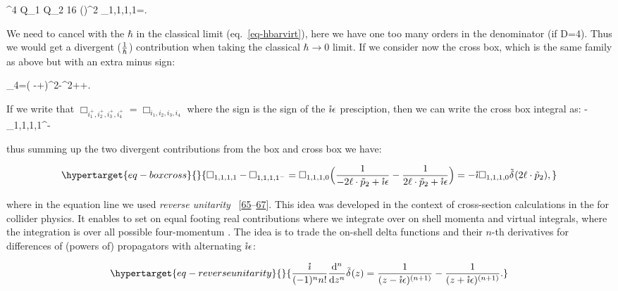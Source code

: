 \documentclass[
  11pt,
  a4paper,
  DIV=11,
  numbers=noendperiod,
  twoside]{scrreprt}
\let\[\relax \let\]\relax %
\DeclareRobustCommand{\[}{\begin{equation}}
\DeclareRobustCommand{\]}{\end{equation}}
\begin{document}
\[
\elch^4 Q_{1} Q_{2} 16 (\semom[1]\cdot \semom[2])^2 \int \dn[D]{{\ell}}\Box_{1,1,1,1}=\order[D-6]{\hbar}.
\]

We need to cancel with the \(\hbar\) in the classical limit
(eq.~\ref{eq-hbarvirt}), here we have one too many orders in the
denominator (if D=4). Thus we would get a divergent (\(\frac{1}{\hbar}\))
contribution when taking the classical \(\hbar\to 0\) limit. If we
consider now the cross box, which is the same family as above but with
an extra minus sign:

\[
\tilde{\rho}_4=( \Half[q] -\ell+\semom[2])^2-\mass[2]^2+\im \epsilon{}\ell\cdot\semom[2]+\im \epsilon.
\]

If we write that
\(\Box_{i_1^+,i_2^+,i_3^+,i_4^+}=\Box_{i_1,i_2,i_3,i_4}\) where the sign
is the sign of the \(\mathring{\imath}\epsilon\) presciption, then we can write the
cross box integral as: \[
\int \dn[D]{\ell} -\Box_{1,1,1,1^-}
\]

thus summing up the two divergent contributions from the box and cross
box we have:

\begin{equation}\protect\hypertarget{eq-boxcross}{}{
\Box_{1,1,1,1}-\Box_{1,1,1,1^-}=\Box_{1,1,1,0}\pa[\Big]{\inv{-2\ell\cdot\semom[2]+\im \epsilon}-\inv{    2\ell\cdot\semom[2]+\im \epsilon}}=-\im\Box_{1,1,1,0}\ndeltafn{2\ell\cdot\semom[2]},
}\label{eq-boxcross}\end{equation}

where in the equation line we used \emph{reverse unitarity}
~{[}\protect\hyperlink{ref-Anastasiou:2002yz}{65}--\protect\hyperlink{ref-Anastasiou:2003yy}{67}{]}.
This idea was developed in the context of cross-section calculations in
the for collider physics. It enables to set on equal footing real
contributions  where we integrate over on shell momenta
 and virtual integrals,
where the integration is over all possible four-momentum . The idea is to trade the on-shell
delta functions and their \(n\)-th derivatives for differences of
(powers of) propagators with alternating \(\mathring{\imath} \epsilon\):

\begin{equation}\protect\hypertarget{eq-reverseunitarity}{}{
\frac{\im}{(-1)^ nn!} \odv[n]{}{z} \ndeltafn{z}   = \inv{\pa{z  -\im \epsilon}^{(n+1)}}  - \inv{\pa{z+\im \epsilon}^{(n+1)}}.
}\label{eq-reverseunitarity}\end{equation}
\end{document}
